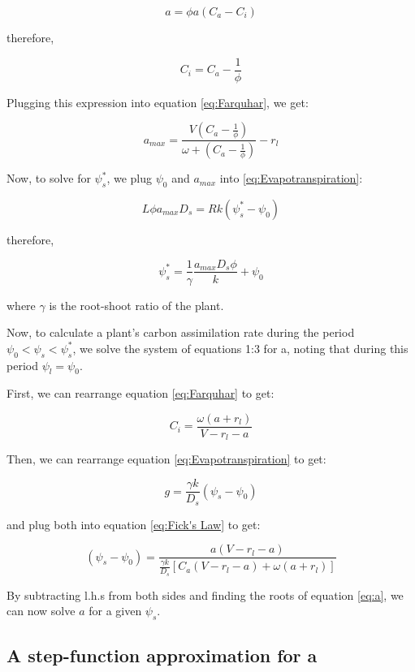 \documentclass{article}
\begin{document}
  $$a = \phi a (C_{a} - C_{i})$$

  therefore,

  $$C_{i} = C_{a} - \frac{1}{\phi}$$

  Plugging this expression into equation \ref{eq:Farquhar}, we get:


  \begin{equation} \label{eq:amax}
    a_{max} = \frac{V \left( C_{a} - \frac{1}{\phi} \right) }{ \omega + \left( C_{a} - \frac{1}{\phi} \right) } - r_{l}
  \end{equation}
  

  Now, to solve for $\psi_{s}^{*}$, we plug $\psi_{0}$ and $a_{max}$ into
  \ref{eq:Evapotranspiration}:

  $$L \phi a_{max} D_{s} = R k (\psi_{s}^{*} - \psi_{0})$$

  therefore,

  \begin{equation} \label{eq:psistar}
    \psi_{s}^{*} = \frac{1}{\gamma} \frac{a_{max}D_{s}\phi}{k} + \psi_{0}
  \end{equation}

  where $\gamma$ is the root-shoot ratio of the plant.

  Now, to calculate a plant's carbon assimilation rate during the period
  $\psi_{0} < \psi_{s} < \psi_{s}^{*}$, we solve the system of equations 1:3 for
  a, noting that during this period $\psi_{l} = \psi_{0}$.

  First, we can rearrange equation \ref{eq:Farquhar} to get:

  $$C_{i} =  \frac{\omega(a + r_{l})}{V - r_{l} - a}$$

  Then, we can rearrange equation \ref{eq:Evapotranspiration} to get:

  $$g = \frac{\gamma k}{D_{s}} (\psi_{s} - \psi_{0})$$

  and plug both into equation \ref{eq:Fick's Law} to get:

  \begin{equation} \label{eq:a}
    (\psi_{s} - \psi_{0}) = \frac{a( V - r_{l} - a)}{\frac{\gamma k}{D_{s}} [C_{a}(V - r_{l} - a) + \omega(a + r_{l}) ]}
  \end{equation}

  By subtracting l.h.s from both sides and finding
  the roots of equation \ref{eq:a}, we can now solve $a$ for a given $\psi_{s}$.

  \subsection{A step-function approximation for a}
\end{document}
